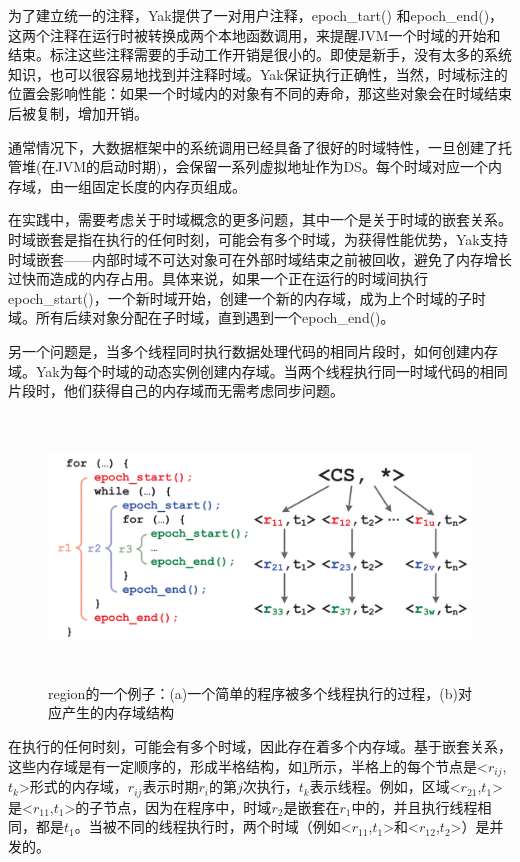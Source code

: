 为了建立统一的注释，Yak提供了一对用户注释，epoch\_tart() 和epoch\_end()，这两个注释在运行时被转换成两个本地函数调用，来提醒JVM一个时域的开始和结束。标注这些注释需要的手动工作开销是很小的。即使是新手，没有太多的系统知识，也可以很容易地找到并注释时域。Yak保证执行正确性，当然，时域标注的位置会影响性能：如果一个时域内的对象有不同的寿命，那这些对象会在时域结束后被复制，增加开销。

通常情况下，大数据框架中的系统调用已经具备了很好的时域特性，一旦创建了托管堆(在JVM的启动时期)，会保留一系列虚拟地址作为DS。每个时域对应一个内存域，由一组固定长度的内存页组成。

在实践中，需要考虑关于时域概念的更多问题，其中一个是关于时域的嵌套关系。时域嵌套是指在执行的任何时刻，可能会有多个时域，为获得性能优势，Yak支持时域嵌套——内部时域不可达对象可在外部时域结束之前被回收，避免了内存增长过快而造成的内存占用。具体来说，如果一个正在运行的时域间执行epoch\_start()，一个新时域开始，创建一个新的内存域，成为上个时域的子时域。所有后续对象分配在子时域，直到遇到一个epoch\_end()。

另一个问题是，当多个线程同时执行数据处理代码的相同片段时，如何创建内存域。Yak为每个时域的动态实例创建内存域。当两个线程执行同一时域代码的相同片段时，他们获得自己的内存域而无需考虑同步问题。


\begin{figure}[h]
    \centering
    \includegraphics[width=12cm,height=7cm]{figure/epoch.png}
    \caption{
        region的一个例子：(a)一个简单的程序被多个线程执行的过程，(b)对应产生的内存域结构
    }
    \label{img2}
\end{figure}
在执行的任何时刻，可能会有多个时域，因此存在着多个内存域。基于嵌套关系，这些内存域是有一定顺序的，形成半格结构，如\ref {img2}所示，半格上的每个节点是<$r_{ij}$,$t_k$>形式的内存域，$r_{ij}$表示时期$r_i$的第$j$次执行，$t_k$表示线程。例如，区域<$r_{21}$,$t_1$>是<$r_{11}$,$t_1$>的子节点，因为在程序中，时域$r_2$是嵌套在$r_1$中的，并且执行线程相同，都是$t_1$。当被不同的线程执行时，两个时域（例如<$r_{11}$,$t_1$>和<$r_{12}$,$t_2$>）是并发的。


